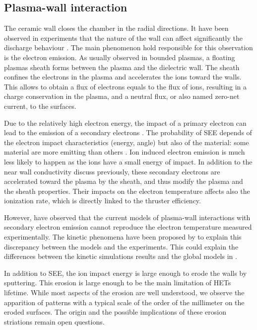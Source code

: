 \subsection*{Plasma-wall interaction}

  The ceramic wall closes the chamber in the radial directions.
  It have been observed in experiments that the nature of the wall can affect significantly the discharge behaviour \citep{gascon2003}.
  The main phenomenon hold responsible for this observation is the electron emission.
  As usually observed in bounded plasmas, a floating plasmas sheath forms between the plasma and the dielectric wall.
  The sheath confines the electrons in the plasma and accelerates the ions toward the walls.
  This allows to obtain a flux of electrons equals to the flux of ions, resulting in a charge conservation in the plasma, and a neutral flux, or also named zero-net current, to the surfaces.
  
  Due to the relatively high electron energy, the impact of a primary electron can lead to the emission of a secondary electrons \citep{barral2003a,villemant2018}.
  The probability of \ac{SEE} depends of the electron impact characteristics (energy, angle) but also of the material\string: some material are more emitting than others \citep{gascon2003}.
  Ion induced electron emission is much less likely to happen as the ions have a small energy of impact.
  In addition to the near wall conductivity discuss previously, these secondary electrons are accelerated toward the plasma by the sheath, and thus modify the plasma and the sheath properties.
  Their impacts on the electron temperature affects also the ionization rate, which is directly linked to the thruster efficiency.
  
  
  However, \citet{raitses2005} have observed that the current models of plasma-wall interactions with secondary electron emission cannot reproduce the electron temperature measured experimentally.
  The kinetic phenomena have been proposed by \citet{sydorenko2007} to explain this discrepancy between the models and the experiments.
  This could explain the differences between the kinetic simulations results and the global models in \citet{croes2017}.   
    
  \vspace{1em}
  In addition to \ac{SEE}, the ion impact energy is large enough to erode the walls by sputtering.
  This erosion is large enough to be the main limitation of \ac{HET}s lifetime.
  While most aspects of the erosion are well understood, we observe the apparition of  patterns with a typical scale of the order of the millimeter on the eroded surfaces.
  The origin and the possible implications of these erosion striations remain open questions.
  

